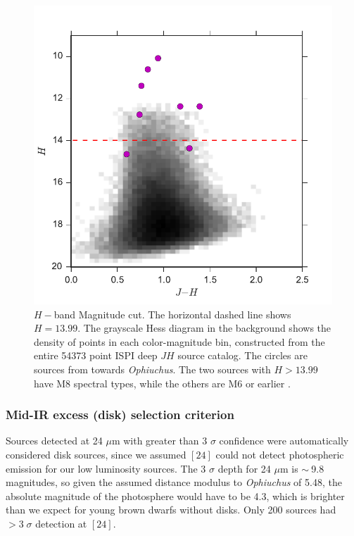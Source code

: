 \begin{figure}[ht!]
  \caption[$H-$band magnitude selection criterion]{$H-$band Magnitude cut.  The horizontal dashed line shows $H=13.99$.  The grayscale Hess diagram in the background shows the density of points in each color-magnitude bin, constructed from the entire 54373 point ISPI deep $JH$ source catalog.  The circles are sources from \citet{allers06} towards \emph{Ophiuchus}.  The two \citet{allers06} sources with $H>13.99$ have M8 spectral types, while the others are M6 or earlier \citep{2011ASPC..448..633G}. \label{fig_NIR_selection_H}}
\centering
\includegraphics[scale=0.6]{chIMACS/figures/NIR_selection_H_allers_oph}
\end{figure}


\subsubsection{Mid-IR excess (disk) selection criterion}
\label{sec_midIR_selection}
Sources detected at 24 $\mu$m with greater than 3 $\sigma$ confidence were automatically considered disk sources, since we assumed $[24]$ could not detect photospheric emission for our low luminosity sources.  The 3 $\sigma$ depth for 24 $\mu$m is $\sim~$9.8 magnitudes, so given the assumed distance modulus to \emph{Ophiuchus} of 5.48, the absolute magnitude of the photosphere would have to be 4.3, which is brighter than we expect for young brown dwarfs without disks.  Only 200 sources had $>3\;\sigma$ detection at $[24]$.

